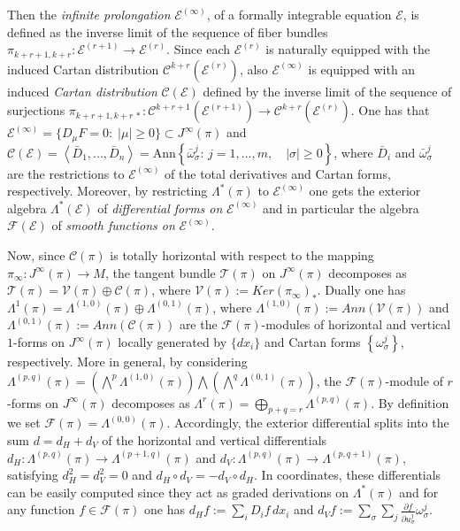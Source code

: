 \documentclass[12pt,english]{elsarticle}
\theoremstyle{plain}
\theoremstyle{plain}
\theoremstyle{remark}
\theoremstyle{plain}
\theoremstyle{definition}
\theoremstyle{definition}
\begin{document}
Then the \textit{infinite prolongation} $\mathcal{E}^{(\infty )}$, of a
formally integrable equation $\mathcal{E}$, is defined as the inverse limit
of the sequence of fiber bundles
$\pi _{k+r+1,k+r}:\mathcal{E}^{(r+1)}\rightarrow \mathcal{E}^{(r)}$. Since
each $\mathcal{E}^{(r)}$ is naturally equipped with the induced Cartan
distribution $\mathcal{C}^{k+r}(\mathcal{E}^{(r)})$, also
$\mathcal{E}^{(\infty )}$ is equipped with an induced
\textit{Cartan distribution} $\mathcal{C}(\mathcal{E})$ defined by the inverse
limit of the sequence of surjections
$\pi _{k+r+1,k+r\,*}:\mathcal{C}^{k+r+1}\left (\mathcal{E}^{(r+1)}
\right )\rightarrow \mathcal{C}^{k+r}\left (\mathcal{E}^{(r)}\right )$.
One has that
$\mathcal{E}^{(\infty )}=\{D_{\mu}F=0:\;|\mu |\geq 0\}\subset J^{
\infty}(\pi )$ and
$\mathcal{C}(\mathcal{E})=\left \langle \bar{D}_{1},...,\bar{D}_{n}
\right \rangle =\text{Ann}\left \{ \bar{\omega}_{\sigma}^{j}:\,j=1,...,m,
\quad |\sigma |\geq 0\right \} $, where $\bar{D}_{i}$ and
$\bar{\omega}_{\sigma}^{j}$ are the restrictions to
$\mathcal{E}^{(\infty )}$ of the total derivatives and Cartan forms, respectively.
Moreover, by restricting $\Lambda ^{*}(\pi )$ to
$\mathcal{E}^{(\infty )}$ one gets the exterior algebra
$\Lambda ^{*}(\mathcal{E})$ of \textit{differential forms on}
$\mathcal{E}^{(\infty )}$ and in particular the algebra
$\mathcal{F}(\mathcal{E})$ of \textit{smooth functions on}
$\mathcal{E}^{(\infty )}$.

Now, since $\mathcal{C}(\pi )$ is totally horizontal with respect to the
mapping $\pi _{\infty}:J^{\infty}(\pi )\rightarrow M$, the tangent bundle
$\mathcal{T}\left (\pi \right )$ on $J^{\infty}(\pi )$ decomposes as
$\mathcal{T}\left (\pi \right )=\mathcal{V}(\pi )\oplus \mathcal{C}(
\pi )$, where
$\mathcal{V}(\pi ):=Ker\left (\pi _{\infty}\right )_{*}$. Dually one has
$\Lambda ^{1}(\pi )=\Lambda ^{(1,0)}(\pi )\oplus \Lambda ^{(0,1)}(
\pi )$, where
$\Lambda ^{(1,0)}(\pi ):=Ann\left (\mathcal{V}(\pi )\right )$ and
$\Lambda ^{(0,1)}(\mathcal{\pi}):=Ann\left (\mathcal{C}(\pi )\right )$
are the $\mathcal{F}(\pi )$-modules of horizontal and vertical $1$-forms
on $J^{\infty}(\pi )$ locally generated by $\{dx_{i}\}$ and Cartan forms
$\left \{ \omega _{\sigma}^{j}\right \} $, respectively. More in general,
by considering
$\Lambda ^{(p,q)}(\pi )=\left (\bigwedge ^{p}\Lambda ^{(1,0)}(\pi )
\right )\bigwedge \left (\bigwedge ^{q}\Lambda ^{(0,1)}(\pi )\right )$,
the $\mathcal{F}(\pi )$-module of $r$-forms on $J^{\infty}(\pi )$ decomposes
as
$\Lambda ^{r}\left (\pi \right )=\bigoplus _{p+q=r}\Lambda ^{(p,q)}
\left (\pi \right )$. By definition we set
$\mathcal{F}(\pi )=\Lambda ^{(0,0)}(\pi )$. Accordingly, the exterior differential
splits into the sum $d=d_{H}+d_{V}$ of the horizontal and vertical differentials
$d_{H}:\Lambda ^{(p,q)}(\mathcal{\pi})\rightarrow \Lambda ^{(p+1,q)}(
\pi )$ and
$d_{V}:\Lambda ^{(p,q)}(\pi )\rightarrow \Lambda ^{(p,q+1)}(\pi )$, satisfying
$d_{H}^{2}=d_{V}^{2}=0$ and $d_{H}\circ d_{V}=-d_{V}\circ d_{H}$. In coordinates,
these differentials can be easily computed since they act as graded derivations
on $\Lambda ^{*}(\pi )$ and for any function
$f\in \mathcal{F}(\pi )$ one has $d_{H}f:=\sum _{i}D_{i}f\,dx_{i}$ and
$d_{V}f:=\sum _{\sigma}\sum _{j}
\frac{\partial f}{\partial u_{\sigma}^{j}}\omega _{\sigma}^{j}$.
\end{document}
